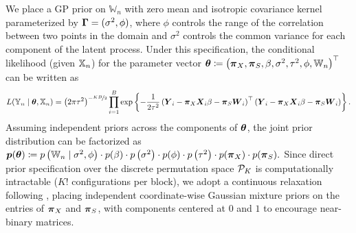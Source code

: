 \documentclass[numsec,webpdf,modern,medium,namedate]{oup-authoring-template}
\theoremstyle{thmstyleone}%
\theoremstyle{thmstyletwo}%
\theoremstyle{thmstylethree}%
\begin{document}
We place a GP prior on $\mathbb{W}_n$ with zero mean and isotropic covariance kernel parameterized by $\boldsymbol{\Gamma} = (\sigma^2,\phi)$, where $\phi$ controls the range of the correlation between two points in the domain and $\sigma^2$ controls the common variance for each component of the latent process. Under this specification, the conditional likelihood (given $\mathbb{X}_n$) for the parameter vector 
$\boldsymbol{\theta} \coloneqq \left(\boldsymbol{\pi}_X, \boldsymbol{\pi}_S, \beta, \sigma^2, \tau^2, \phi, \mathbb{W}_n\right)^\top$ can be written as
{
\footnotesize
$$
L(\mathbb{Y}_n\mid\boldsymbol{\theta}, \mathbb{X}_n) = \left(2 \pi \tau^2\right)^{-\nicefrac{KB}{2}}
\prod_{i=1}^B 
\exp \left\{-\dfrac{1}{2 \tau^2}
\left(\boldsymbol{Y}_i-\boldsymbol{\pi}_X \boldsymbol{X}_i \beta-\boldsymbol{\pi}_S \boldsymbol{W}_i\right)^\top
\left(\boldsymbol{Y}_i-\boldsymbol{\pi}_X \boldsymbol{X}_i \beta-\boldsymbol{\pi}_S \boldsymbol{W}_i\right)\right\}.
$$}
Assuming independent priors across the components of $\boldsymbol{\theta}$, the joint prior distribution can be factorized as
{
\small
$
\boldsymbol{p}(\boldsymbol{\theta}) \coloneqq p\left(\mathbb{W}_n \mid \sigma^2, \phi\right) \cdot p(\beta) \cdot p\left(\sigma^2\right)\cdot p(\phi)\cdot p\left(\tau^2\right) \cdot p(\boldsymbol{\pi}_X)\cdot p(\boldsymbol{\pi}_S).
$}
Since direct prior specification over the discrete permutation space $\mathcal{P}_K$ is computationally intractable ($K!$ configurations per block), we adopt a continuous relaxation following \cite{maddison2016concrete,linderman2018reparameterizing}, placing independent coordinate-wise Gaussian mixture priors on the entries of $\boldsymbol{\pi}_X$ and $\boldsymbol{\pi}_S$, with components centered at $0$ and $1$ to encourage near-binary matrices.
\end{document}
